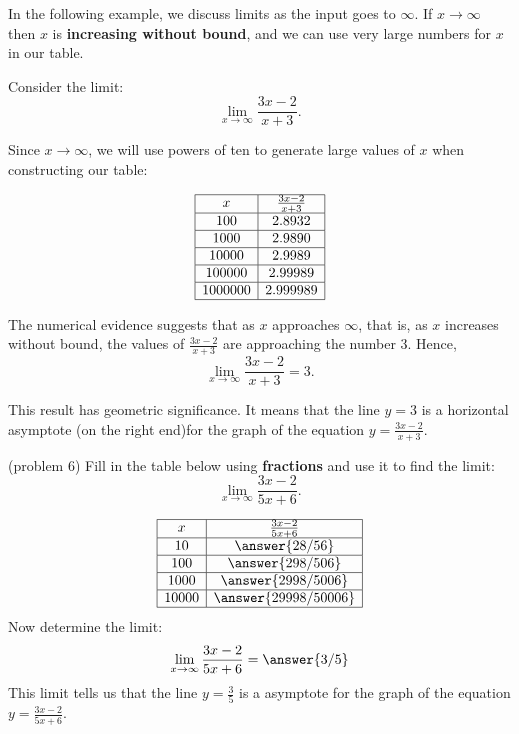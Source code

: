 \documentclass[handout]{ximera}
\begin{document}
In the following example, we discuss limits as the input goes to $\infty$.
If $x \to \infty$ then $x$ is \textbf{increasing without bound}, and we can use very large numbers for $x$ in our table.

\begin{example}[example 6]
Consider the limit:
\[\lim_{x \to \infty} \frac{3x -2}{x + 3}. \]

Since $x \to \infty$, we will use powers of ten to generate large values of $x$ when constructing 
our table: 


\[
\begin{array}{ |c | c|}
	\hline
  x & \frac{3x -2}{x + 3}\\
  \hline
  100 & 2.8932 \\
  \hline
  1000 & 2.9890 \\
  \hline
  10000 & 2.9989 \\
  \hline
  100000 & 2.99989 \\
  \hline
  1000000 & 2.999989\\
  \hline
\end{array}
\] 

The numerical evidence suggests that as $x$ approaches $\infty$, that is, 
as $x$ increases without bound, the values of $\frac{3x -2}{x +3}$ are approaching the number $3$. Hence,
\[\lim_{x \to \infty} \frac{3x -2}{x +3} = 3. \]

This result has geometric significance.  It means that the line $y = 3$ is a horizontal 
asymptote (on the right end)for the graph of the equation $y = \frac{3x -2}{x +3}.$
\end{example}


\begin{problem}(problem 6)
Fill in the table below using \textbf{fractions} and use it to find the limit:
\[\lim_{x \to \infty} \frac{3x-2}{5x+6}.\]


\[
\begin{array}{| c | c |}
	\hline
  x & \frac{3x-2}{5x+6}\\
  \hline
  10 & \answer{28/56}  \\ 
	\hline 
	100 & \answer{298/506}\\
	\hline
	1000 & \answer{2998/5006}	\\
	\hline
	10000 & \answer{29998/50006}\\
	\hline
\end{array}
\]
Now determine the limit:
\[
\lim_{x \to \infty} \frac{3x-2}{5x+6} = \answer{3/5}
\]
This limit tells us that the line $y = \frac{3}{5}$ is a 
asymptote for the graph of the equation $y = \frac{3x-2}{5x+6}$.	
\end{problem}
\end{document}
